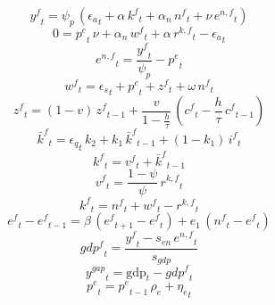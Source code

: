 \begin{dmath}
{{y^{f}}}_{t}={{\psi_{p}}}\, \left({{\epsilon_{a}}}_{t}+{{\alpha}}\, {{k^{f}}}_{t}+{{\alpha_{n}}}\, {{n^{f}}}_{t}+{{\nu}}\, {{e^{n,f}}}_{t}\right)
\end{dmath}
\begin{dmath}
0={{p^{e}}}_{t}\, {{\nu}}+{{\alpha_{n}}}\, {{w^{f}}}_{t}+{{\alpha}}\, {{r^{k,f}}}_{t}-{{\epsilon_{a}}}_{t}
\end{dmath}
\begin{dmath}
{{e^{n,f}}}_{t}=\frac{{{y^{f}}}_{t}}{{{\psi_{p}}}}-{{p^{e}}}_{t}
\end{dmath}
\begin{dmath}
{{w^{f}}}_{t}={{\epsilon_{s}}}_{t}+{{p^{c}}}_{t}+{{z^{f}}}_{t}+{{\omega}}\, {{n^{f}}}_{t}
\end{dmath}
\begin{dmath}
{{z^{f}}}_{t}=\left(1-{{v}}\right)\, {{z^{f}}}_{t-1}+\frac{{{v}}}{1-\frac{{{h}}}{{{\tau}}}}\, \left({{c^{f}}}_{t}-\frac{{{h}}}{{{\tau}}}\, {{c^{f}}}_{t-1}\right)
\end{dmath}
\begin{dmath}
{{\bar{k}^{f}}}_{t}={{\epsilon_{q}}}_{t}\, {{k_{2}}}+{{k_{1}}}\, {{\bar{k}^{f}}}_{t-1}+\left(1-{{k_{1}}}\right)\, {{i^{f}}}_{t}
\end{dmath}
\begin{dmath}
{{k^{f}}}_{t}={{v^{f}}}_{t}+{{\bar{k}^{f}}}_{t-1}
\end{dmath}
\begin{dmath}
{{v^{f}}}_{t}=\frac{1-{{\psi}}}{{{\psi}}}\, {{r^{k,f}}}_{t}
\end{dmath}
\begin{dmath}
{{k^{f}}}_{t}={{n^{f}}}_{t}+{{w^{f}}}_{t}-{{r^{k,f}}}_{t}
\end{dmath}
\begin{dmath}
{{e^{f}}}_{t}-{{e^{f}}}_{t-1}={{\beta}}\, \left({{e^{f}}}_{t+1}-{{e^{f}}}_{t}\right)+{{e_{1}}}\, \left({{n^{f}}}_{t}-{{e^{f}}}_{t}\right)
\end{dmath}
\begin{dmath}
{{gdp^{f}}}_{t}=\frac{{{y^{f}}}_{t}-{{s_{en}}}\, {{e^{n,f}}}_{t}}{{{s_{gdp}}}}
\end{dmath}
\begin{dmath}
{{y^{gap}}}_{t}={{\mathrm{gdp}}}_{t}-{{gdp^{f}}}_{t}
\end{dmath}
\begin{dmath}
{{p^{e}}}_{t}={{p^{e}}}_{t-1}\, {{\rho_{e}}}+{{\eta_{e}}}_{t}
\end{dmath}
